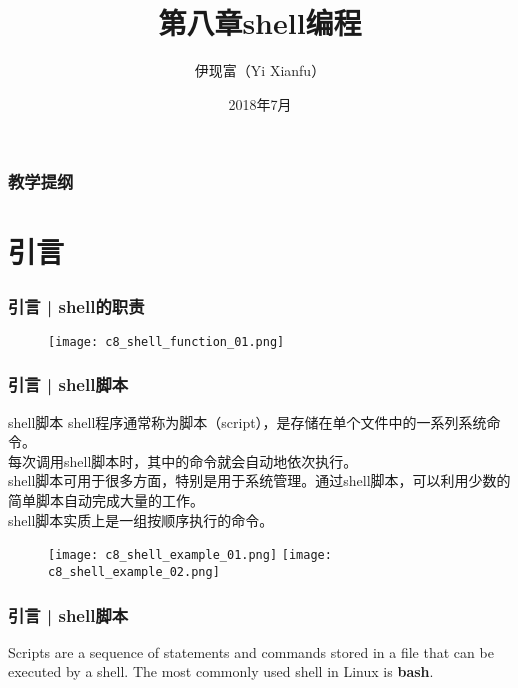 



\title[shell编程]{第八章\quad shell编程}
\author[Yixf]{伊现富（Yi Xianfu）}
\date{2018年7月}


\begin{frame}
  \titlepage
\end{frame}

\begin{frame}[plain,label=current]
  \frametitle{教学提纲}
  \setcounter{tocdepth}{3}
  \begin{multicols}{2}
    \tableofcontents
  \end{multicols}
\end{frame}


\section{引言}
\begin{frame}
  \frametitle{引言 | shell的职责}
  \begin{figure}
    \centering
    \texttt{[image: c8\_shell\_function\_01.png]}
  \end{figure}
\end{frame}

\begin{frame}
  \frametitle{引言 | shell脚本}
  \begin{block}{shell脚本}
    shell程序通常称为脚本（script），是存储在单个文件中的一系列系统命令。\\
    每次调用shell脚本时，其中的命令就会自动地依次执行。\\
    shell脚本可用于很多方面，特别是用于系统管理。通过shell脚本，可以利用少数的简单脚本自动完成大量的工作。\\
    shell脚本实质上是一组按顺序执行的命令。
  \end{block}
  \begin{figure}
    \centering
    \texttt{[image: c8\_shell\_example\_01.png]}
    \texttt{[image: c8\_shell\_example\_02.png]}
  \end{figure}
\end{frame}

\begin{frame}
  \frametitle{引言 | shell脚本}
  Scripts are a sequence of statements and commands stored in a file that can be executed by a shell. The most commonly used shell in Linux is \textbf{bash}.
\end{frame}

